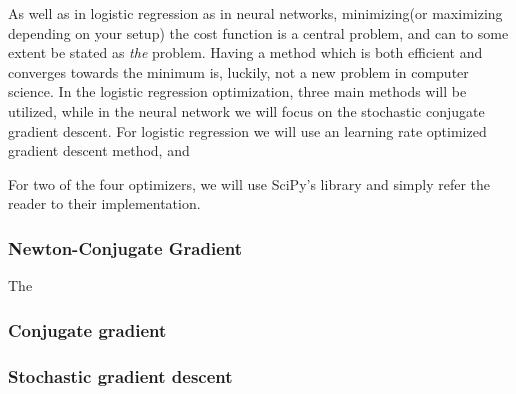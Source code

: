 As well as in logistic regression as in neural networks, minimizing(or maximizing depending on your setup) the cost function is a central problem, and can to some extent be stated as \textit{the} problem. Having a method which is both efficient and converges towards the minimum is, luckily, not a new problem in computer science. In the logistic regression optimization, three main methods will be utilized, while in the neural network we will focus on the stochastic conjugate gradient descent. For logistic regression we will use an learning rate optimized gradient descent method, and 

For two of the four optimizers, we will use SciPy's library\cite{scipy} and simply refer the reader to their implementation.



\subsubsection{Newton-Conjugate Gradient}
The 

\subsubsection{Conjugate gradient}

\subsubsection{Stochastic gradient descent}


